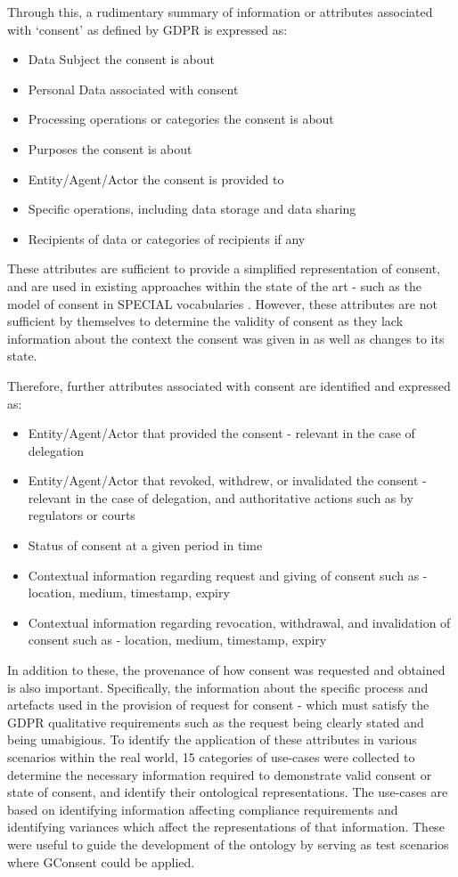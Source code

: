 Through this, a rudimentary summary of information or attributes associated with `consent' as defined by GDPR is expressed as:
\begin{itemize}
    \item Data Subject the consent is about
    \item Personal Data associated with consent
    \item Processing operations or categories the consent is about
    \item Purposes the consent is about
    \item Entity/Agent/Actor the consent is provided to
    \item Specific operations, including data storage and data sharing
    \item Recipients of data or categories of recipients if any
\end{itemize}
These attributes are sufficient to provide a simplified representation of consent, and are used in existing approaches within the state of the art - such as the model of consent in SPECIAL vocabularies \cite{bonatti_special_2018}. However, these attributes are not sufficient by themselves to determine the validity of consent as they lack information about the context the consent was given in as well as changes to its state.

Therefore, further attributes associated with consent are identified and expressed as:
\begin{itemize}
    \item Entity/Agent/Actor that provided the consent - relevant in the case of delegation
    \item Entity/Agent/Actor that revoked, withdrew, or invalidated the consent - relevant in the case of delegation, and authoritative actions such as by regulators or courts
    \item Status of consent at a given period in time
    \item Contextual information regarding request and giving of consent such as - location, medium, timestamp, expiry
    \item Contextual information regarding revocation, withdrawal, and invalidation of consent such as - location, medium, timestamp, expiry
\end{itemize}
In addition to these, the provenance of how consent was requested and obtained is also important.
Specifically, the information about the specific process and artefacts used in the provision of request for consent - which must satisfy the GDPR qualitative requirements such as the request being clearly stated and being umabigious.
To identify the application of these attributes in various scenarios within the real world, 15 categories of use-cases were collected to determine the necessary information required to demonstrate valid consent or state of consent, and identify their ontological representations.
The use-cases are based on identifying information affecting compliance requirements and identifying variances which affect the representations of that information.
These were useful to guide the development of the ontology by serving as test scenarios where GConsent could be applied.

